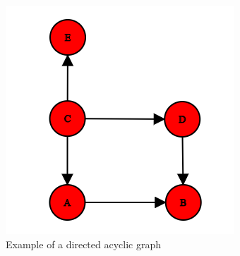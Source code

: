 \begin{figure}[H]
\centering
  \includegraphics[width=0.45\linewidth]{figures/dag_example.png}
  \caption{Example of a directed acyclic graph}
  \label{fig:dag_example}
\end{figure}






